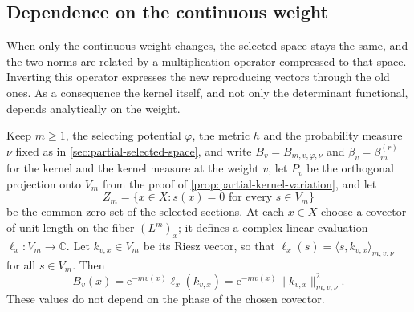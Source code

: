 \subsection{Dependence on the continuous weight}
\label{sec:partial-kernel-parameters}

When only the continuous weight changes, the selected space stays the same, and the two norms are related by a multiplication operator compressed to that space. Inverting this operator expresses the new reproducing vectors through the old ones. As a consequence the kernel itself, and not only the determinant functional, depends analytically on the weight.

Keep $m\geq1$, the selecting potential $\varphi$, the metric $h$ and the probability measure $\nu$ fixed as in \cref{sec:partial-selected-space}, and write $B_v=B_{m,v,\varphi,\nu}$ and $\beta_v=\beta_m^{(r)}$ for the kernel and the kernel measure at the weight $v$, let $P_v$ be the orthogonal projection onto $V_m$ from the proof of \cref{prop:partial-kernel-variation}, and let
\[
 Z_m=\{x\in X:s(x)=0\text{ for every }s\in V_m\}
\]
be the common zero set of the selected sections. At each $x\in X$ choose a covector of unit length on the fiber $(L^m)_x$; it defines a complex-linear evaluation $\ell_x\colon V_m\to\mathbb C$. Let $k_{v,x}\in V_m$ be its Riesz vector, so that $\ell_x(s)=\langle s,k_{v,x}\rangle_{m,v,\nu}$ for all $s\in V_m$. Then
\begin{equation}\label{eq:partial-kernel-weighted-riesz}
 B_v(x)=\mathrm{e}^{-mv(x)}\ell_x(k_{v,x})
       =\mathrm{e}^{-mv(x)}\|k_{v,x}\|_{m,v,\nu}^2.
\end{equation}
These values do not depend on the phase of the chosen covector.


